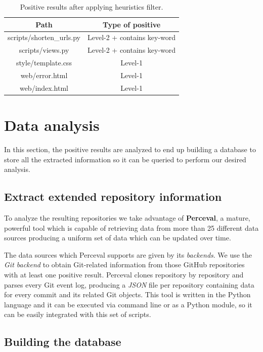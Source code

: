 \documentclass[a4paper, 12pt]{book}
\begin{document}
\begin{table}[]
\centering
\caption{Positive results after applying heuristics filter.}
\label{table:heuristics-positive-example}
\begin{tabular}{|c|c|}
\hline
\textbf{Path}              & \textbf{Type of positive}   \\ \hline
scripts/shorten\_urls.py & Level-2 + contains key-word   \\
scripts/views.py           & Level-2 + contains key-word \\
style/template.css         & Level-1                     \\
web/error.html             & Level-1                     \\
web/index.html             & Level-1                     \\ \hline
\end{tabular}
\end{table}
\section{Data analysis}
\label{sec:data-analysis}

In this section, the positive results are analyzed to end up building a database to store
all the extracted information so it can be queried to perform our desired analysis.

\subsection{Extract extended repository information}
\label{ssec:extract-perceval}
To analyze the resulting repositories we take advantage of \textbf{Perceval}, a mature, powerful tool which
is capable of retrieving data from more than 25 different data sources producing a uniform set of data which can be
updated over time.

The data sources which Perceval supports are given by its \emph{backends}. We use the \emph{Git backend} to
obtain Git-related information from those GitHub repositories with at least one positive result.
Perceval clones repository by repository and parses every Git event log, producing a \emph{JSON} file
per repository containing data for every commit and its related Git objects. This tool is written in the Python
language and it can be executed via command line or as a Python module, so it can be easily integrated with
this set of scripts.

\subsection{Building the database}
\label{ssec:build-database}
\end{document}
